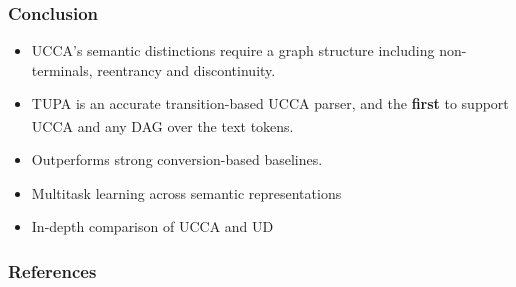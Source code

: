 \documentclass[t,xcolor={svgnames}]{beamer}
\newcommand{\parser}[1]{TUPA\textsubscript{#1}}
\begin{document}
\begin{frame}
\frametitle{Conclusion}
\begin{itemize}
 \item UCCA's semantic distinctions require a graph structure including {\color{blue}non-terminals}, {\color{orange}reentrancy} and {\color{red}discontinuity}.
 \item \parser{} is an accurate transition-based UCCA parser,
 	and the \textbf{first} to support UCCA and any DAG over the text tokens.
 \item Outperforms strong conversion-based baselines.
\item Multitask learning across semantic representations
\item In-depth comparison of UCCA and UD
\end{itemize}
\end{frame}

\begin{frame}[allowframebreaks]
\frametitle{References}

\tiny
\end{frame}
\end{document}
